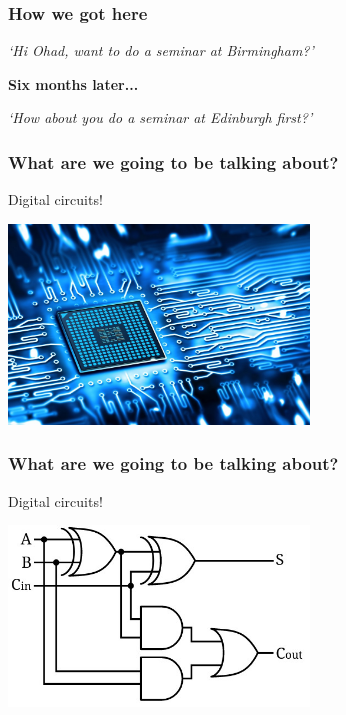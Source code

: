 \begin{frame}
    \frametitle{How we got here}
    \centering
    \pause
    \qquad
    \begin{minipage}{0.7\textwidth}
        \emph{`Hi Ohad, want to do a seminar at Birmingham?'}
    \end{minipage}

    \pause
    \LARGE
    \textbf{Six months later...}
    \normalsize
    \pause

    \begin{minipage}{0.6\textwidth}
        \emph{`How about you do a seminar at Edinburgh first?'}
    \end{minipage}
    \qquad
\end{frame}

\begin{frame}
    \frametitle{What are we going to be talking about?}
    \pause
    \centering
    \LARGE
    Digital circuits!

    \includegraphics[width=0.6\textwidth]{imgs/circuit}
\end{frame}
\begin{frame}
    \frametitle{What are we going to be talking about?}
    \centering
    \LARGE
    Digital circuits!

    \includegraphics[width=0.6\textwidth]{imgs/adder}
\end{frame}


